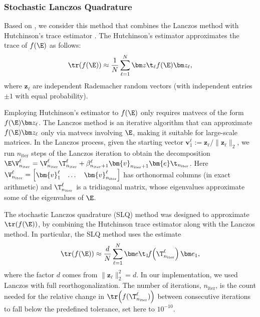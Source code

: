 \documentclass{aims} %
\theoremstyle{definition}
\begin{document}
\subsubsection*{Stochastic Lanczos Quadrature} Based on \cite{Bai_Golub,Ubaru}, we consider this method that combines the Lanczos method with Hutchinson's trace estimator \cite{Hutchinson}. The Hutchinson's estimator approximates the trace of $f(\E)$ as follows:
 \begin{align}\label{def:Hutchinsons_estimator}
     \tr (f(\E))\approx \frac{1}{N}\sum_{\ell =1 }^N \bm z\t_\ell f(\E)\bm z_\ell,
 \end{align}
where $\bm z_\ell$ are independent Rademacher random vectors (with independent entries $\pm 1$ with equal probability). 
 
Employing Hutchinson's estimator to $f(\E)$ only  requires matvecs of the form $f(\E) \bm z_\ell$.  
 The Lanczos method is an iterative algorithm that can approximate $f(\E) \bm z_\ell$ only via matvecs involving  $\E$, making it suitable for large-scale matrices. 
 In the Lanczos process, given the starting vector $\bm{v}_1^\ell:=\bm{z}_\ell/\|\bm{z}_\ell\|_2$, we run $n_\text{iter}$ steps of the Lanczos iteration to obtain the decomposition $\E\V_{n_\text{iter}}^\ell = \V_{n_\text{iter}}^\ell\T^\ell_{n_\text{iter}} + \beta_{n_\text{iter}+1}^\ell\bm{v}_{n_\text{iter}+1}\bm{e}\t_{n_\text{iter}}$. 
 Here $\V_{n_\text{iter}} ^\ell = \begin{bmatrix} \bm{v}_1^\ell & \dots &\bm{v}_{n_\text{iter}}^\ell\end{bmatrix}$ 
 has orthonormal columns (in exact arithmetic) and $\T^\ell_{n_\text{iter}}$ is a tridiagonal matrix, whose eigenvalues approximate some of the eigenvalues of $\E$. 
 
 
 
 The stochastic Lanczos quadrature (SLQ) method was designed to approximate $\tr( f(\E))$, by combining the Hutchinson trace estimator along with the Lanczos method.  In particular, the SLQ method uses the estimate
 \begin{align}
     \tr (f(\E))\approx \frac{d}{N}\sum_{\ell =1 }^N \bm e\t_1\! f\!\left(\T^\ell_{n_\text{iter}}\right)\bm e_1,
 \end{align}
where the factor 
$d$ comes from $\|\bm z_\ell\|_2^2 =d.$  
In our implementation, we used Lanczos with full reorthogonalization.
The number of iterations, \( n_\text{iter} \), is the count needed for the relative change in \( \tr\!\left(f(\T^\ell_{n_\text{iter}})\right) \) between consecutive iterations to fall below the predefined tolerance, set here to \( 10^{-10} \).
\end{document}
